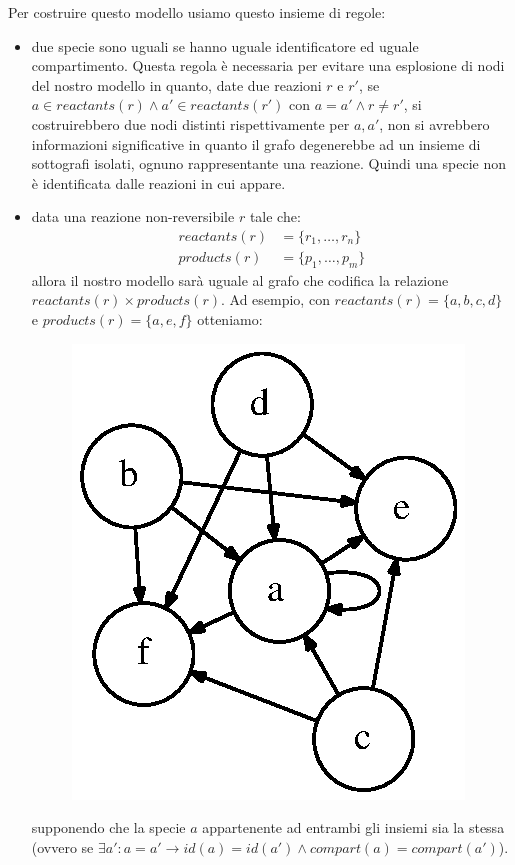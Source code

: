 Per costruire questo modello usiamo questo insieme di regole:
\begin{itemize}
\item due specie sono uguali se hanno uguale identificatore ed uguale
  compartimento. Questa regola \`e necessaria per evitare una
  esplosione di nodi del nostro modello in quanto, date due reazioni
  $r$ e $r'$, se $a \in reactants(r) \wedge a' \in reactants(r')$ con
  $a = a' \wedge r \not = r'$, si costruirebbero due nodi distinti
  rispettivamente per $a, a'$, non si avrebbero informazioni
  significative in quanto il grafo degenerebbe ad un insieme di
  sottografi isolati, ognuno rappresentante una reazione. Quindi una
  specie non \`e identificata dalle reazioni in cui appare.
\item data una reazione non-reversibile $r$ tale che:
  \begin{displaymath}
    \begin{split} 
      reactants(r) &= \{ r_{1}, \ldots, r_{n} \} \\
      products(r) &= \{ p_{1}, \ldots, p_{m} \}
    \end{split}
  \end{displaymath}
  allora il nostro modello sar\`a uguale al grafo che codifica la
  relazione $reactants(r) \times products(r)$. Ad esempio, con
  $reactants(r) = \{ a, b, c, d \}$ e $products(r) = \{a, e, f\}$
  otteniamo:

\begin{figure}[!htb]
\centering
\includegraphics{images/non-reversible-reaction-example.dot.eps}
\end{figure}
supponendo che la specie $a$ appartenente ad entrambi gli
insiemi sia la stessa (ovvero se $\exists a': a = a' \rightarrow id(a) =
id(a') \wedge compart(a) = compart(a')$).


\end{itemize}

